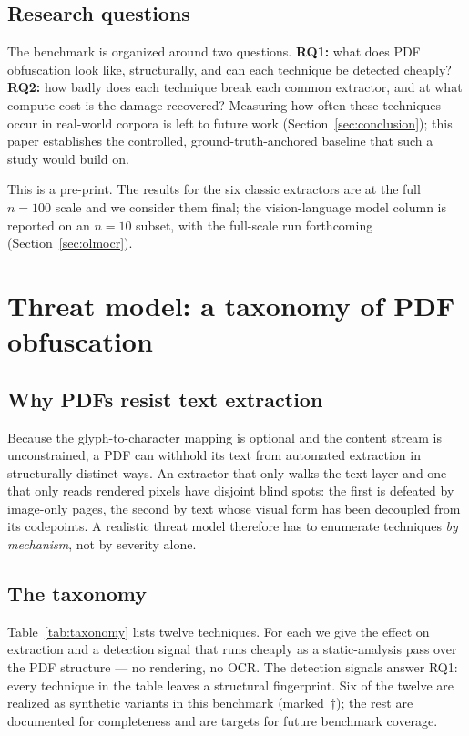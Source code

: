 \documentclass[11pt]{article}
\begin{document}
\subsection{Research questions}

The benchmark is organized around two questions. \textbf{RQ1:} what does
PDF obfuscation look like, structurally, and can each technique be
detected cheaply? \textbf{RQ2:} how badly does each technique break each
common extractor, and at what compute cost is the damage recovered?
Measuring how often these techniques occur in real-world corpora is left
to future work (Section~\ref{sec:conclusion}); this paper establishes
the controlled, ground-truth-anchored baseline that such a study would
build on.

This is a pre-print. The results for the six classic extractors are at
the full $n=100$ scale and we consider them final; the vision-language
model column is reported on an $n=10$ subset, with the full-scale run
forthcoming (Section~\ref{sec:olmocr}).

\section{Threat model: a taxonomy of PDF obfuscation}
\label{sec:threat}

\subsection{Why PDFs resist text extraction}

Because the glyph-to-character mapping is optional and the content
stream is unconstrained, a PDF can withhold its text from automated
extraction in structurally distinct ways. An extractor that only walks
the text layer and one that only reads rendered pixels have disjoint
blind spots: the first is defeated by image-only pages, the second by
text whose visual form has been decoupled from its codepoints. A
realistic threat model therefore has to enumerate techniques
\emph{by mechanism}, not by severity alone.

\subsection{The taxonomy}

Table~\ref{tab:taxonomy} lists twelve techniques. For each we give the
effect on extraction and a detection signal that runs cheaply as a
static-analysis pass over the PDF structure --- no rendering, no OCR.
The detection signals answer RQ1: every technique in the table leaves a
structural fingerprint. Six of the twelve are realized as synthetic
variants in this benchmark (marked~$\dagger$); the rest are documented
for completeness and are targets for future benchmark coverage.
\end{document}
